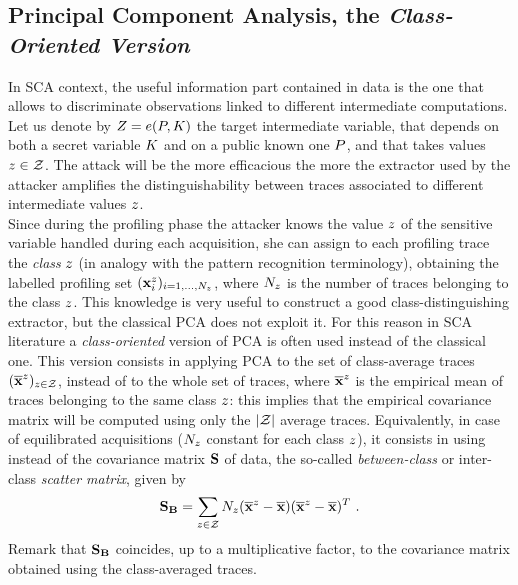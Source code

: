 \subsection{Principal Component Analysis, the {\em Class-Oriented Version}}
In SCA context, the useful information part contained in data is the one that allows to discriminate observations linked to different intermediate computations. Let us denote by $Z = e(P,K)$ the target intermediate variable, that depends on both a secret variable $K$ and on a public known one $P$, and that takes values $z \in \mathcal{Z}$. The attack will be the more efficacious the more the extractor used by the attacker amplifies the distinguishability between traces associated to different intermediate values $z$.\\
Since during the profiling phase the attacker knows the value $z$ of the sensitive variable handled during each acquisition, she can assign to each profiling trace the {\em class} $z$ (in analogy with the pattern recognition terminology), obtaining the labelled profiling set $(\textbf{x}^{z}_{i})_{i=1,\dots,N_{z}}$, where $N_{z}$ is the number of traces belonging to the class $z$. This knowledge is very useful to construct a good class-distinguishing extractor, but the classical PCA does not exploit it. For this reason in SCA literature a {\em class-oriented} version of PCA is often used instead of the classical one. This version  consists in applying PCA to the set of class-average traces $(\overline{\textbf{x}}^{z})_{z \in \mathcal{Z}}$, instead of to the whole set of traces, where $\overline{\textbf{x}}^{z}$ is the empirical mean of traces belonging to the same class $z$: this implies that the empirical covariance matrix will be computed using only the $\lvert \mathcal{Z} \rvert$ average traces. Equivalently, in case of equilibrated acquisitions ($N_{z}$ constant for each class $z$), it consists in using instead of the covariance matrix $\textbf{S}$ of data, the so-called {\em between-class} or inter-class {\em scatter matrix}, given by
\begin{equation}\label{eq:SB}
\textbf{S}_{\textbf{B}} = \sum_{z\in\mathcal{Z}}N_{z}(\overline{\textbf{x}}^{z}-\overline{\textbf{x}})(\overline{\textbf{x}}^{z}-\overline{\textbf{x}})^T \mbox{ .}
\end{equation}
Remark that $\textbf{S}_{\textbf{B}}$ coincides, up to a multiplicative factor, to the covariance matrix obtained using the class-averaged traces.

